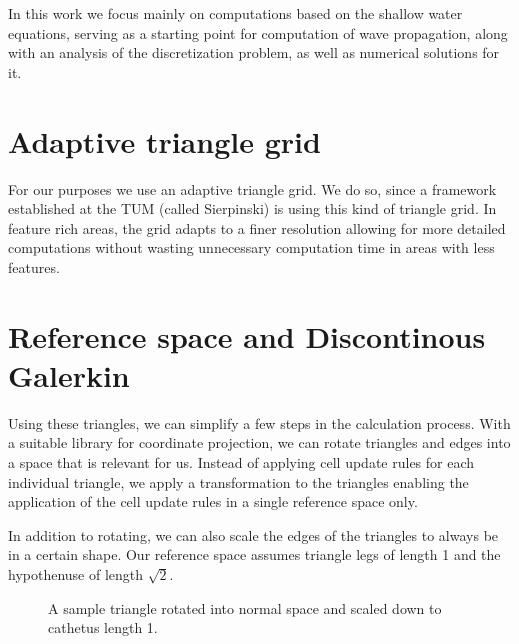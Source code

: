 \documentclass{article}
\begin{document}
In this work we focus mainly on computations based on the shallow water equations, serving as a starting point for computation of wave propagation, along with an analysis of the discretization problem, as well as numerical solutions for it.

\section{Adaptive triangle grid}
\label{sec:triangles}

For our purposes we use an adaptive triangle grid. We do so, since a framework established at the TUM (called Sierpinski) is using this kind of triangle grid.
In feature rich areas, the grid adapts to a finer resolution allowing for more detailed computations without wasting unnecessary computation time in areas with less features.


\section{Reference space and Discontinous Galerkin}
\label{sec:reference-space-dg}

Using these triangles, we can simplify a few steps in the calculation process.
With a suitable library for coordinate projection, we can rotate triangles and edges into a space that is relevant for us.
Instead of applying cell update rules for each individual triangle, we apply a transformation to the triangles enabling the application of the cell update rules in a single reference space only.

In addition to rotating, we can also scale the edges of the triangles to always be in a certain shape.
Our reference space assumes triangle legs of length 1 and the hypothenuse of length $\sqrt{2}$.

\begin{figure}[ht]
  \centering
  \caption{A sample triangle rotated into normal space and scaled down to cathetus length 1.}
  \label{fig:triangle-projection}
\end{figure}
\end{document}
